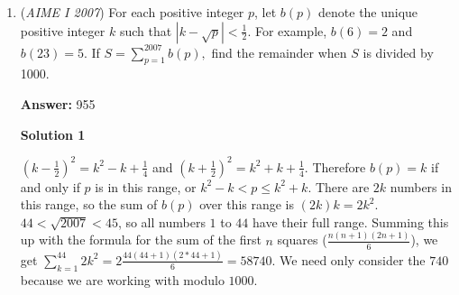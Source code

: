 \begin{enumerate}
 



\textbf{Solution 8}

We can use generating functions. Suppose that the variables $a$, $b$, $c$, and $d$ represent shading a square that appears in the first, second, third, or fourth columns, respectively. Then if two squares in the row are shaded, then the row is represented by the generating function $ab+ac+ad+bc+bd+cd$, which we can write as $P(a,b,c,d)=(ab+cd)+(a+b)(c+d)$. Therefore, $P(a,b,c,d)^6$ represents all of the possible ways to color six rows such that each row has two shaded squares. We only want the possibilities when each column has three shaded squares, or rather, the coefficient of $a^3b^3c^3d^3$ in $P(a,b,c,d)^6$.

 By the Binomial Theorem,
 \[P(a,b,c,d)^6=\sum_{k=0}^6 \binom{6}{k} (ab+cd)^k(a+b)^{6-k}(c+d)^{6-k}.\tag{1}\]If we expand $(ab+cd)^k$, then the powers of $a$ and $b$ are always equal. Therefore, to obtain terms of the form $a^3b^3c^3d^3$, the powers of $a$ and $b$ in $(a+b)^{6-k}$ must be equal. In particular, only the central term in the binomial expansion will contribute, and this implies that $k$ must be even. We can use the same logic for $c$ and $d$. Therefore, the coefficient of $a^3b^3c^3d^3$ in the following expression is the same as the coefficient of $a^3b^3c^3d^3$ in (1).
 \[\sum_{k=0}^3 \binom{6}{2k} (ab+cd)^{2k}(ab)^{3-k}(cd)^{3-k}\binom{6-2k}{3-k}^2.\tag{2}\]Now we notice that the only way to obtain terms of the form $a^3b^3c^3d^3$ is if we take the central term in the binomial expansion of $(ab+cd)^{2k}$. Therefore, the terms that contribute to the coefficient of $a^3b^3c^3d^3$ in (2) are
 \[\sum_{k=0}^3 \binom{6}{2k}\binom{2k}{k}\binom{6-2k}{3-k}^2(abcd)^3.\]This sum is $400+1080+360+20=1860$ so the answer is $\boxed{860}$.

 


	\item (\textit{AIME I 2007}) For each positive integer $p$, let $b(p)$ denote the unique positive integer $k$ such that $|k-\sqrt{p}| < \frac{1}{2}$.  For example, $b(6) = 2$ and $b(23) = 5$.  If $S = \sum_{p=1}^{2007} b(p),$ find the remainder when $S$ is divided by 1000.


 
 \textbf{Answer: }955



\textbf{Solution 1}

$\left(k- \frac 12\right)^2=k^2-k+\frac 14$ and $\left(k+ \frac 12\right)^2=k^2+k+ \frac 14$. Therefore $b(p)=k$ if and only if $p$ is in this range, or $k^2-k<p\leq k^2+k$. There are $2k$ numbers in this range, so the sum of $b(p)$ over this range is $(2k)k=2k^2$. $44<\sqrt{2007}<45$, so all numbers $1$ to $44$ have their full range. Summing this up with the formula for the sum of the first $n$ squares ($\frac{n(n+1)(2n+1)}{6}$), we get $\sum_{k=1}^{44}2k^2=2\frac{44(44+1)(2*44+1)}{6}=58740$. We need only consider the $740$ because we are working with modulo $1000$.


\end{enumerate}
